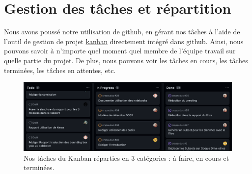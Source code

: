 \section{Gestion des tâches et répartition}
Nous avons poussé notre utilisation de github, en gérant nos tâches à l'aide de l'outil de gestion de projet \href{https://github.com/topics/kanban}{kanban} directement intégré dans github. Ainsi, nous pouvons savoir à n'importe quel moment quel membre de l'équipe travail sur quelle partie du projet. De plus, nous pouvons voir les tâches en cours, les tâches terminées, les tâches en attentes, etc. 

\begin{figure}[htb!]
    \centering
    \includegraphics[width=0.8\linewidth]{images/kanban.png}
    \caption{Nos tâches du Kanban réparties en 3 catégories : à faire, en cours et terminées.}
    \label{fig:kanban}
\end{figure}

